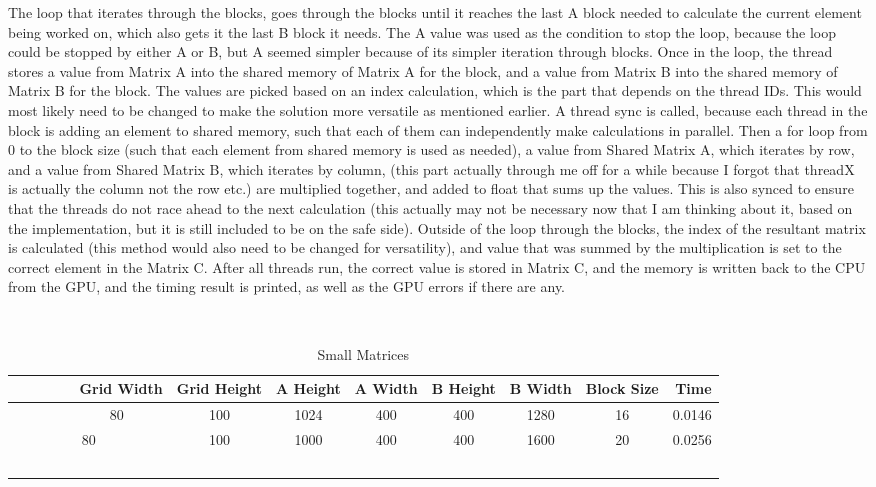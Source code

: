 \documentclass[8pt]{article}
\begin{document}
The loop that iterates through the blocks, goes through the blocks until it reaches the last A block needed to calculate the current element being worked on, which also gets it the last B block it needs.  The A value was used as the condition to stop the loop, because the loop could be stopped by either A or B, but A seemed simpler because of its simpler iteration through blocks.  Once in the loop, the thread stores a value from Matrix A into the shared memory of Matrix A for the block, and a value from Matrix B into the shared memory of Matrix B for the block.  The values are picked based on an index calculation, which is the part that depends on the thread IDs.  This would most likely need to be changed to make the solution more versatile as mentioned earlier.  A thread sync is called, because each thread in the block is adding an element to shared memory, such that each of them can independently make calculations in parallel.  Then a for loop from 0 to the block size (such that each element from shared memory is used as needed), a value from Shared Matrix A, which iterates by row, and a value from Shared Matrix B, which iterates by column, (this part actually through me off for a while because I forgot that threadX is actually the column not the row etc.) are multiplied together, and added to float that sums up the values.  This is also synced to ensure that the threads do not race ahead to the next calculation (this actually may not be necessary now that I am thinking about it, based on the implementation, but it is still included to be on the safe side).  Outside of the loop through the blocks, the index of the resultant matrix is calculated (this method would also need to be changed for versatility), and value that was summed by the multiplication is set to the correct element in the Matrix C.  After all threads run, the correct value is stored in Matrix C, and the memory is written back to the CPU from the GPU, and the timing result is printed, as well as the GPU errors if there are any.\\

\pagebreak[4]

\begin{table}[hp]
\caption {Small Matrices} \label{tab:title}
    \begin{tabular}{|c|c|c|c|c|c|c|r|}\hline
        Grid Width & Grid Height & A Height & A Width & B Height & B Width & Block Size & Time \\ \hline
        80 & 100 & 1024 & 400 & 400 & 1280 & 16 & 0.0146\\ \hline
	80 & 100 & 1000 & 400 & 400 & 1600 & 20 & 0.0256\\ \hline
    \end{tabular}
\end{table}
\end{document}
